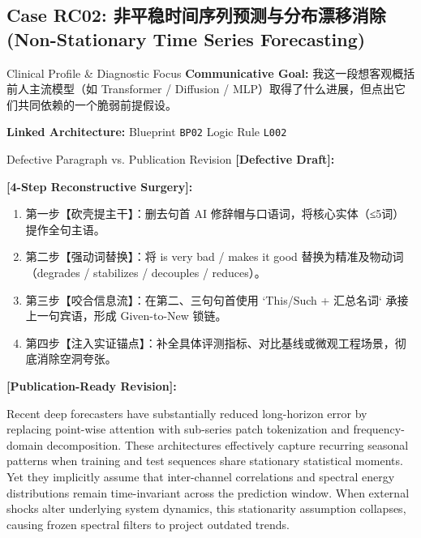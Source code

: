 \subsection{Case RC02: 非平稳时间序列预测与分布漂移消除 (Non-Stationary Time Series Forecasting)}\label{case:RC02}
\begin{ConceptBox}{Clinical Profile \& Diagnostic Focus}
\textbf{Communicative Goal:} 我这一段想客观概括前人主流模型（如 Transformer / Diffusion / MLP）取得了什么进展，但点出它们共同依赖的一个脆弱前提假设。\par
\textbf{Linked Architecture:} Blueprint \texttt{BP02} \enspace\textbar\enspace Logic Rule \texttt{L002}
\end{ConceptBox}
\begin{ExampleBox}{Defective Paragraph vs. Publication Revision}
\textbf{\color{TargetHighlight}[Defective Draft]:}\par
{}\par\vspace{6pt}
\textbf{\color{AcadForest}[4-Step Reconstructive Surgery]:}
\begin{enumerate}[label=\textbf{\color{AcadNavy}Step \arabic*:}, leftmargin=2em]
  \item 第一步【砍壳提主干】：删去句首 AI 修辞帽与口语词，将核心实体（≤5词）提作全句主语。
  \item 第二步【强动词替换】：将 is very bad / makes it good 替换为精准及物动词（degrades / stabilizes / decouples / reduces）。
  \item 第三步【咬合信息流】：在第二、三句句首使用 `This/Such + 汇总名词` 承接上一句宾语，形成 Given-to-New 锁链。
  \item 第四步【注入实证锚点】：补全具体评测指标、对比基线或微观工程场景，彻底消除空洞夸张。
\end{enumerate}\vspace{4pt}
\textbf{\color{AcadNavy}[Publication-Ready Revision]:}\par
Recent deep forecasters have substantially reduced long-horizon error by replacing point-wise attention with sub-series patch tokenization and frequency-domain decomposition. These architectures effectively capture recurring seasonal patterns when training and test sequences share stationary statistical moments. Yet they implicitly assume that inter-channel correlations and spectral energy distributions remain time-invariant across the prediction window. When external shocks alter underlying system dynamics, this stationarity assumption collapses, causing frozen spectral filters to project outdated trends.
\end{ExampleBox}
